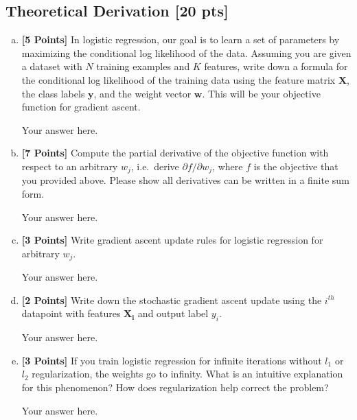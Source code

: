 \documentclass[a4paper]{article}
\theoremstyle{definition}
\def\y{\mathbf y}
\def\w{\mathbf w}
\newenvironment{soln}{
    \leavevmode\color{red}\ignorespaces
}{}
\begin{document}
\subsection{Theoretical Derivation [20 pts]}

\begin{enumerate}[(a)]

\item {\bf [5 Points]} In logistic regression, our goal is to learn a set of parameters by maximizing the conditional log likelihood of the data. Assuming you are given a dataset with $N$ training examples and $K$ features, write down a formula for the conditional log likelihood of the training data using the feature matrix $\mathbf{X}$, the class labels $\y$, and the weight vector $\w$. This will be your objective function for gradient ascent.

\begin{soln}
Your answer here.
\end{soln}

\item {\bf [7 Points]} Compute the partial derivative of the objective function with respect to an arbitrary $w_j$, i.e.~derive $\partial f / \partial w_j$, where $f$ is the objective that you provided above. Please show all derivatives can be written in a finite sum form.

\begin{soln}
Your answer here.
\end{soln}

\item {\bf [3 Points]} Write gradient ascent update rules for logistic regression for arbitrary $w_j$.

\begin{soln}
Your answer here.
\end{soln}

\item {\bf [2 Points]} Write down the stochastic gradient ascent update using the $i^{th}$ datapoint with features $\mathbf{X_i}$ and output label $y_i$.

\begin{soln}
Your answer here.
\end{soln}

\item {\bf [3 Points]} If you train logistic regression for infinite iterations without $l_1$ or $l_2$ regularization, the weights go to infinity. What is an intuitive explanation for this phenomenon? How does regularization help correct the problem?

\begin{soln}
Your answer here.
\end{soln}

\end{enumerate}
\end{document}

